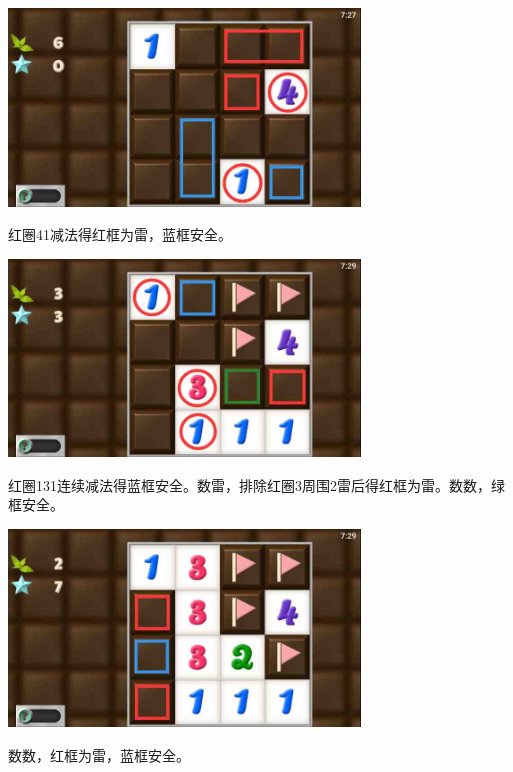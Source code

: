 \subsection{} %
\begin{center}
    \includegraphics[width=0.7\textwidth]{puzzlelow/42-1.jpg}
\end{center}
红圈41减法得红框为雷，蓝框安全。
\begin{center}
    \includegraphics[width=0.7\textwidth]{puzzlelow/42-2.jpg}
\end{center}
红圈131连续减法得蓝框安全。数雷，排除红圈3周围2雷后得红框为雷。数数，绿框安全。
\begin{center}
    \includegraphics[width=0.7\textwidth]{puzzlelow/42-3.jpg}
\end{center}
数数，红框为雷，蓝框安全。

